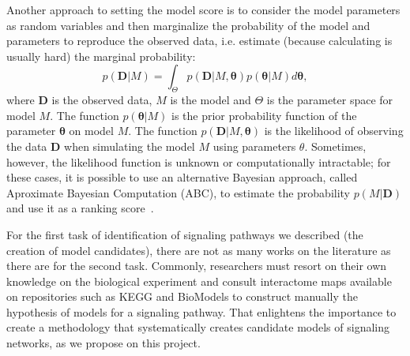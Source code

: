 Another approach to setting the model score is to consider the model 
parameters as random variables and then marginalize the probability of 
the model and parameters to reproduce the observed data, i.e. estimate 
(because calculating is usually hard) the marginal probability:
\begin{equation}
    p ({\bm D} | M) = \int_{\Theta} p ({\bm D} | M, {\bm \theta}) 
        p({\bm \theta} | M) d{\bm \theta},
    \label{eq:marginal_likelihood_integral}
\end{equation}
where ${\bm D}$ is the observed data, $M$ is the model and $\Theta$ is 
the parameter space for model $M$. The function $p({\bm \theta} | M)$ is 
the prior probability function of the parameter ${\bm \theta}$ on model 
$M$. The function $p ({\bm D} | M, {\bm \theta})$ is the likelihood of 
observing the data ${\bm D}$ when simulating the model $M$ using 
parameters $\theta$. Sometimes, however, the likelihood function is 
unknown or computationally intractable; for these cases, it is possible 
to use an alternative Bayesian approach, called Aproximate Bayesian 
Computation (ABC), to estimate the probability $p (M | {\bm D})$ and use 
it as a ranking score~\cite{Toni2009}.

For the first task of identification of signaling pathways we described
(the creation of model candidates), there are not as many works on the 
literature as there are for the second task. Commonly, researchers must 
resort on their own knowledge on the biological experiment and consult 
interactome maps available on repositories such as KEGG and BioModels to
construct manually the hypothesis of models for a signaling pathway. 
That enlightens the importance to create a methodology that 
systematically creates candidate models of signaling networks, as we 
propose on this project.



